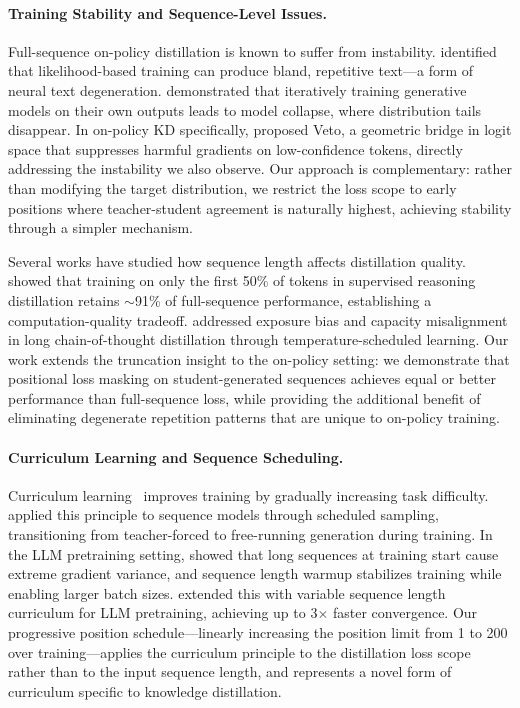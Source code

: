 \paragraph{Training Stability and Sequence-Level Issues.}
Full-sequence on-policy distillation is known to suffer from instability.
\citet{holtzman2020curious} identified that likelihood-based training can produce bland, repetitive text---a form of neural text degeneration.
\citet{shumailov2024collapse} demonstrated that iteratively training generative models on their own outputs leads to model collapse, where distribution tails disappear.
In on-policy KD specifically, \citet{jang2026veto} proposed Veto, a geometric bridge in logit space that suppresses harmful gradients on low-confidence tokens, directly addressing the instability we also observe.
Our approach is complementary: rather than modifying the target distribution, we restrict the loss scope to early positions where teacher-student agreement is naturally highest, achieving stability through a simpler mechanism.

Several works have studied how sequence length affects distillation quality.
\citet{chen2025distillingessence} showed that training on only the first 50\% of tokens in supervised reasoning distillation retains $\sim$91\% of full-sequence performance, establishing a computation-quality tradeoff.
\citet{yan2026dasd} addressed exposure bias and capacity misalignment in long chain-of-thought distillation through temperature-scheduled learning.
Our work extends the truncation insight to the on-policy setting: we demonstrate that positional loss masking on student-generated sequences achieves equal or better performance than full-sequence loss, while providing the additional benefit of eliminating degenerate repetition patterns that are unique to on-policy training.

\paragraph{Curriculum Learning and Sequence Scheduling.}
Curriculum learning~\citep{bengio2009curriculum} improves training by gradually increasing task difficulty.
\citet{bengio2015scheduled} applied this principle to sequence models through scheduled sampling, transitioning from teacher-forced to free-running generation during training.
In the LLM pretraining setting, \citet{li2022stability} showed that long sequences at training start cause extreme gradient variance, and sequence length warmup stabilizes training while enabling larger batch sizes.
\citet{pouransari2024dataset} extended this with variable sequence length curriculum for LLM pretraining, achieving up to 3$\times$ faster convergence.
Our progressive position schedule---linearly increasing the position limit from 1 to 200 over training---applies the curriculum principle to the distillation loss scope rather than to the input sequence length, and represents a novel form of curriculum specific to knowledge distillation.

